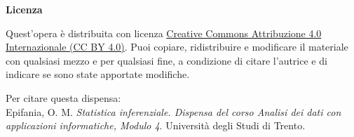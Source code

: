 {  %
  \thispagestyle{empty}
  \null\vfill
  \noindent\textbf{Licenza}\par
  \vspace{2mm}
  \noindent Quest'opera è distribuita con licenza
  \href{https://creativecommons.org/licenses/by/4.0/deed.it}{Creative Commons
  Attribuzione 4.0 Internazionale (CC BY 4.0)}.
  Puoi copiare, ridistribuire e modificare il materiale con qualsiasi mezzo
  e per qualsiasi fine, a condizione di citare l'autrice e di indicare se
  sono state apportate modifiche.

  \vspace{3mm}
  \noindent Per citare questa dispensa:\\
  Epifania, O. M. \emph{Statistica inferenziale. Dispensa del corso Analisi dei
  dati con applicazioni informatiche, Modulo 4}. Università degli Studi
  di Trento.
  \clearpage
}
